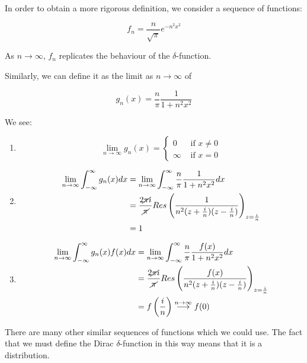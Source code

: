\documentclass{physics_notes}
\begin{document}
In order to obtain a more rigorous definition, we consider a sequence of functions:

\begin{equation*}
f_n = \frac{n}{\sqrt{\pi}}e^{-n^2x^2}
\end{equation*}

As $n\to\infty$, $f_n$ replicates the behaviour of the $\delta$-function.

Similarly, we can define it as the limit as $n\to\infty$ of

\begin{equation*}
g_n(x) = \frac{n}{\pi}\frac{1}{1+n^2x^2}
\end{equation*}

We see:

\begin{enumerate}
	\item{\[\lim_{n\to\infty}g_n(x) = \begin{cases} 0 & \text{ if } x\neq0 \\ \infty & \text{ if } x=0\end{cases}\]}
	\item{
	\begin{align*} \lim_{n\to\infty}\int_{-\infty}^\infty g_n(x)dx &= \lim_{n\to\infty}\int_{-\infty}^\infty \frac{n}{\pi}\frac{1}{1+n^2x^2}dx \\
	&= \frac{2\cancel{\pi} i}{\cancel{\pi}}Res\left(\frac{1}{n^2(z+\frac{i}{n})(z-\frac{i}{n})}\right)_{z=\frac{i}{n}} \\
	&= 1
	\end{align*}}
	\item{
	\begin{align*} \lim_{n\to\infty}\int_{-\infty}^\infty g_n(x)f(x)dx &= \lim_{n\to\infty}\int_{-\infty}^\infty \frac{n}{\pi}\frac{f(x)}{1+n^2x^2}dx \\
	&= \frac{2\cancel{\pi} i}{\cancel{\pi}}Res\left(\frac{f(x)}{n^2(z+\frac{i}{n})(z-\frac{i}{n})}\right)_{z=\frac{i}{n}} \\
	&= f\left(\frac{i}{n}\right) \stackrel{n\to\infty}{\longrightarrow} f(0)
	\end{align*}}
\end{enumerate}

There are many other similar sequences of functions which we could use. The fact that we must define the Dirac $\delta$-function in this way means that it is a distribution.
\end{document}
